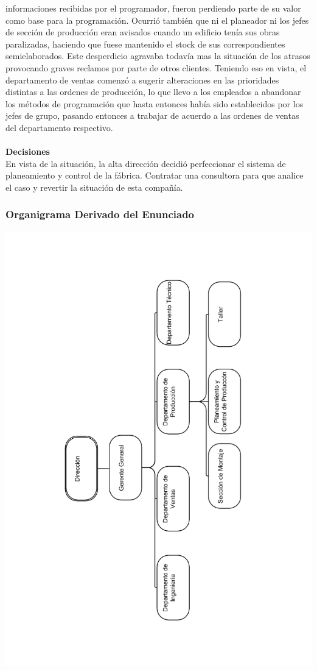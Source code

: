 \documentclass[a4paper,10pt,titlepage]{article}
\begin{document}
informaciones recibidas por el programador, fueron perdiendo parte de su valor como
base para la programaci\'on. Ocurri\'o tambi\'en que ni el planeador ni los jefes de secci\'on
de producci\'on eran avisados cuando un edificio ten\'ia sus obras paralizadas, haciendo
que fuese mantenido el stock de sus correspondientes semielaborados. Este
desperdicio agravaba todav\'ia mas la situaci\'on de los atrasos provocando graves
reclamos por parte de otros clientes. Teniendo eso en vista, el departamento de ventas
comenz\'o a sugerir alteraciones en las prioridades distintas a las ordenes de
producci\'on, lo que llevo a los empleados a abandonar los m\'etodos de programaci\'on
que hasta entonces hab\'ia sido establecidos por los jefes de grupo, pasando entonces a
trabajar de acuerdo a las ordenes de ventas del departamento respectivo.\\ \\
\textbf{Decisiones}\\
En vista de la situaci\'on, la alta direcci\'on decidi\'o perfeccionar el sistema de
planeamiento y control de la f\'abrica.
Contratar una consultora para que analice el caso y revertir la situaci\'on de esta compa\~n\'ia.

\newpage
\subsubsection{Organigrama Derivado del Enunciado}
\begin{center}
\includegraphics[width=150mm]{./herculesBN.png}
 \end{center}
\end{document}
